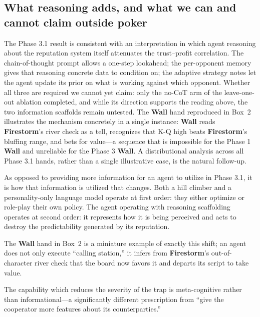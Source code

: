\documentclass[10pt]{article} %
\newcommand{\arch}[1]{\textbf{#1}}
\begin{document}
\subsection{What reasoning adds, and what we can and cannot claim
outside poker}
The Phase 3.1 result is consistent with an interpretation in
which agent reasoning about the reputation system itself
attenuates the trust--profit correlation. The chain-of-thought
prompt allows a one-step lookahead; the per-opponent memory
gives that reasoning concrete data to condition on; the
adaptive strategy notes let the agent update its prior on what
is working against which opponent. Whether all three are required we
cannot yet claim: only the no-CoT arm of the leave-one-out ablation
completed, and while its direction supports the reading above, the two
information scaffolds remain untested. The \arch{Wall} hand reproduced in Box~2
illustrates the mechanism concretely in a single instance:
\arch{Wall} reads \arch{Firestorm}'s river check as a tell,
recognizes that K-Q high beats \arch{Firestorm}'s bluffing
range, and bets for value---a sequence that is impossible for
the Phase 1 \arch{Wall} and unreliable for the Phase 3
\arch{Wall}. A distributional analysis across all Phase 3.1
hands, rather than a single illustrative case, is the natural
follow-up.

As opposed to providing more information for an agent to utilize in
Phase 3.1, it is how that information is utilized that changes. Both a hill
climber and a personality-only language model operate at first order: they
either optimize or role-play their own policy. The agent operating with
reasoning scaffolding operates at second order: it represents how it is being
perceived and acts to destroy the predictability generated by its reputation.

The \arch{Wall} hand in Box~2 is a miniature example of exactly this shift;
an agent does not only execute ``calling station,'' it infers from
\arch{Firestorm}'s out-of-character river check that the board now favors it and
departs its script to take value.

The capability which reduces the severity of the trap is meta-cognitive
rather than informational---a significantly different prescription from ``give
the cooperator more features about its counterparties.''
\end{document}
